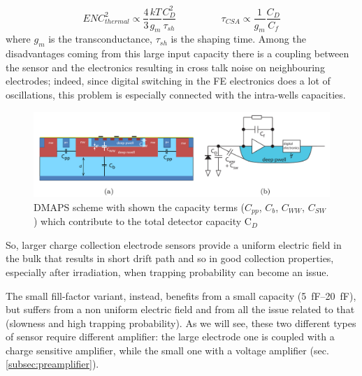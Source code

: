       \begin{equation}
         ENC^2 _ {thermal} \propto \frac{4}{3}\frac{kT}{g_m}\frac{C_D ^2}{\tau_{sh}}
         \hspace{55pt}
         \tau_{CSA} \propto \frac{1}{g_m}\frac{C_D}{C_f}
      \end{equation}
      where $g_m$ is the transconductance, $\tau_{sh}$ is the shaping time. 
      Among the disadvantages coming from this large input capacity there is a coupling between the sensor and the electronics resulting in cross talk noise on neighbouring electrodes; indeed, since digital switching in the FE electronics does a lot of oscillations, this problem is especially connected with the intra-wells capacities.
      \begin{figure}[h!]
         \centering\includegraphics[width=12cm]{figures/Pixel_detectors/DMAPS_capacity.png}
         \caption{DMAPS scheme with shown the capacity terms ($C_{pp}$, $C_{b}$, $C_{WW}$, $C_{SW}$) which contribute to the total detector capacity C$_{D}$}
         \label{fig:DMAPS_capacity}
      \end{figure}
      So, larger charge collection electrode sensors provide a uniform electric field in the bulk that results in short drift path and so in good collection properties, especially after irradiation, when trapping probability can become an issue.

      The small fill-factor variant, instead, benefits from a small capacity (\SIrange{5}{20}{fF}), but suffers from a non uniform electric field and from all the issue related to that (slowness and high trapping probability). 
      As we will see, these two different types of sensor require different amplifier: the large electrode one is coupled with a charge sensitive amplifier, while the small one with a voltage amplifier (sec.\ref{subsec:preamplifier}).

